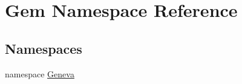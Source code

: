 \hypertarget{namespaceGem}{
\section{Gem Namespace Reference}
\label{df/d00/namespaceGem}
}
\subsection*{Namespaces}
\begin{DoxyCompactItemize}
\item 
namespace \hyperlink{namespaceGem_1_1Geneva}{Geneva}
\end{DoxyCompactItemize}
